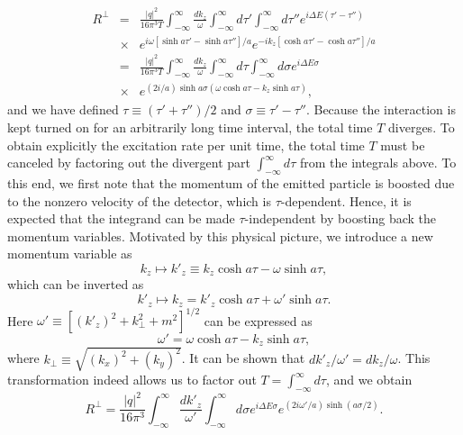 \documentclass[12pt,nofootinbib,floatfix,aps,prd,showpacs,amsmath,amssymb,eqsecnum]{revtex4-2}
\begin{document}
\begin{eqnarray}
R^\perp & = & \frac{|q|^2}{16\pi^3 T} 
             \int^{\infty}_{-\infty} \frac{ d k_z }{ \omega }
             \int^{\infty}_{-\infty} d\tau' 
             \int^{\infty}_{-\infty} d\tau''  
             e^{i\Delta E (\tau' - \tau'')}     
\nonumber \\   
& \times & e^{ i \omega [\sinh a\tau' - \sinh a\tau'']/a }
           e^{-i k_z    [\cosh a\tau' - \cosh a\tau'']/a }
\nonumber \\
&=&  \frac{|q|^2}{16\pi^3 T}
     \int^{\infty}_{-\infty} \frac{dk_z}{\omega}
     \int^{\infty}_{-\infty} d \tau
     \int^{\infty}_{-\infty} d \sigma 
     e^{i\Delta E \sigma}
\nonumber \\
& \times & e^{ (2 i/a) \sinh a\sigma 
              (\omega \cosh a\tau - k_z \sinh a\tau ) },
\nonumber
\end{eqnarray}  
and we have defined
$
\tau \equiv (\tau' + \tau'')/2
$ 
and 
$
\sigma \equiv \tau' - \tau'' 
$. 
Because the interaction is kept turned on for an arbitrarily long time 
interval, 
the total time $T$ diverges. To obtain 
explicitly the excitation rate per unit time,
the total time $T$ must be 
canceled by factoring out the divergent part 
$\int_{-\infty}^{\infty}d\tau$ from the integrals above. 
To this end, we first
note that the momentum of the emitted 
particle is boosted due to the nonzero
velocity of the detector, which is $\tau$-dependent.  
Hence, it is expected
that the integrand can be made $\tau$-independent by
boosting back the momentum variables.  
Motivated by this physical picture, we introduce a new momentum
variable as 
\begin{equation}
k_z \mapsto {k'}_z \equiv 
k_z \cosh a \tau - \omega \sinh a\tau,
\label{k->k'}
\end{equation}
which can be inverted as
\begin{equation}
{k'}_z \mapsto k_z = 
{k'}_z \cosh a \tau + {\omega'} \sinh a\tau.
\label{k'->k}
\end{equation}
Here
$
{\omega'} \equiv [({k'}_z)^{2} +k_\perp^2 +m^2]^{1/2} 
$
can be expressed as
$$
{\omega'} = \omega \cosh a \tau - k_z \sinh a \tau,
$$ 
where 
$
k_\perp \equiv \sqrt{(k_x)^2 + (k_y)^2}
$.
It can be shown that 
$ 
d {k'}_z/{\omega'} = d k_z/ \omega
$. 
This transformation indeed allows us to factor out
$T=\int_{-\infty}^\infty d\tau$, and we obtain
\begin{equation}
R^\perp =\frac{|q|^2}{16\pi^3 }
     \int^{\infty}_{-\infty} \frac{d {k'}_z}{{\omega'}}
     \int^{\infty}_{-\infty} d \sigma 
     e^{i\Delta E \sigma}
     e^{ (2 i {\omega'}/a)  \sinh (a\sigma/2)}.
\end{equation}
\end{document}
